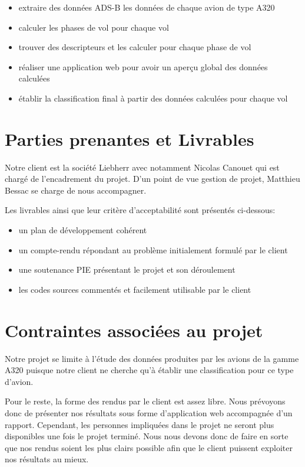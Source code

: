\begin{itemize}
	\item extraire des données ADS-B les données de chaque avion de type A320
	\item calculer les phases de vol pour chaque vol
	\item trouver des descripteurs et les calculer pour chaque phase de vol
	\item réaliser une application web pour avoir un aperçu global des données calculées
	\item établir la classification final à partir des données calculées pour chaque vol
\end{itemize}

\section*{Parties prenantes et Livrables}
Notre client est la société Liebherr avec notamment Nicolas Canouet qui est chargé de l'encadrement du projet. D'un point de vue gestion de projet, Matthieu Bessac se charge de nous accompagner.

Les livrables ainsi que leur critère d'acceptabilité sont présentés ci-dessous:
\begin{itemize}
	\item un plan de développement cohérent
	\item un compte-rendu répondant au problème initialement formulé par le client
	\item une soutenance PIE présentant le projet et son déroulement
	\item les codes sources commentés et facilement utilisable par le client
\end{itemize}



\section*{Contraintes associées au projet}
Notre projet se limite à l'étude des données produites par les avions de la gamme A320 puisque notre client ne cherche qu'à établir une classification pour ce type d'avion.

Pour le reste, la forme des rendus par le client est assez libre. Nous prévoyons donc de présenter nos résultats sous forme d'application web accompagnée d'un rapport. Cependant, les personnes impliquées dans le projet ne seront plus disponibles une fois le projet terminé. Nous nous devons donc de faire en sorte que nos rendus soient les plus clairs possible afin que le client puissent exploiter nos résultats au mieux.

